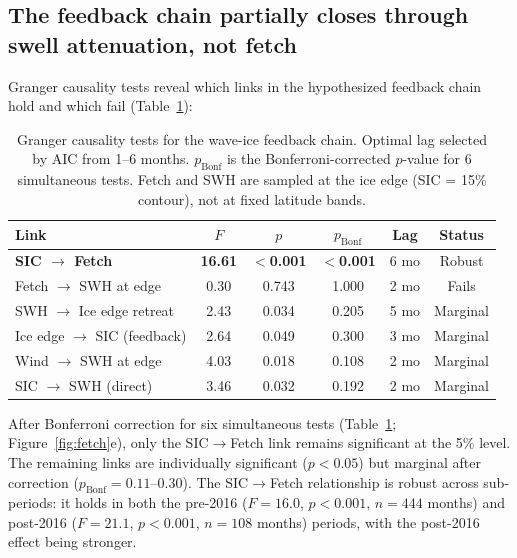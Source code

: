 \documentclass[11pt]{article}
\begin{document}

\subsection{The feedback chain partially closes through swell attenuation, not fetch}

Granger causality tests reveal which links in the hypothesized feedback chain hold and which fail (Table~\ref{tab:granger}):

\begin{table}[htbp]
\centering
\caption{Granger causality tests for the wave-ice feedback chain. Optimal lag selected by AIC from 1--6 months. $p_{\mathrm{Bonf}}$ is the Bonferroni-corrected $p$-value for 6 simultaneous tests. Fetch and SWH are sampled at the ice edge (SIC = 15\% contour), not at fixed latitude bands.}
\label{tab:granger}
\begin{tabular}{lccccc}
\hline
Link & $F$ & $p$ & $p_{\mathrm{Bonf}}$ & Lag & Status \\
\hline
\textbf{SIC $\to$ Fetch} & \textbf{16.61} & \textbf{$<$0.001} & \textbf{$<$0.001} & 6 mo & Robust \\
Fetch $\to$ SWH at edge & 0.30 & 0.743 & 1.000 & 2 mo & Fails \\
SWH $\to$ Ice edge retreat & 2.43 & 0.034 & 0.205 & 5 mo & Marginal \\
Ice edge $\to$ SIC (feedback) & 2.64 & 0.049 & 0.300 & 3 mo & Marginal \\
Wind $\to$ SWH at edge & 4.03 & 0.018 & 0.108 & 2 mo & Marginal \\
SIC $\to$ SWH (direct) & 3.46 & 0.032 & 0.192 & 2 mo & Marginal \\
\hline
\end{tabular}
\end{table}

After Bonferroni correction for six simultaneous tests (Table~\ref{tab:granger}; Figure~\ref{fig:fetch}e), only the SIC$\to$Fetch link remains significant at the 5\% level. The remaining links are individually significant ($p < 0.05$) but marginal after correction ($p_{\mathrm{Bonf}} = 0.11$--$0.30$). The SIC$\to$Fetch relationship is robust across sub-periods: it holds in both the pre-2016 ($F = 16.0$, $p < 0.001$, $n = 444$ months) and post-2016 ($F = 21.1$, $p < 0.001$, $n = 108$ months) periods, with the post-2016 effect being stronger.
\end{document}
